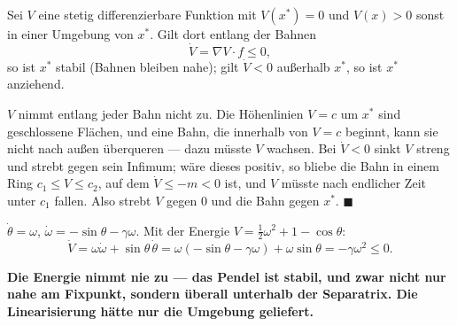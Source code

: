\begin{merksatz}
Sei $V$ eine stetig differenzierbare Funktion mit $V(x^{*}) = 0$ und $V(x) > 0$ sonst in einer Umgebung von $x^{*}$. Gilt dort entlang der Bahnen
\[ \dot V = \nabla V\cdot f \le 0 , \]
so ist $x^{*}$ stabil (Bahnen bleiben nahe); gilt $\dot V < 0$ außerhalb $x^{*}$, so ist $x^{*}$ anziehend.

$V$ nimmt entlang jeder Bahn nicht zu. Die Höhenlinien $V = c$ um $x^{*}$ sind geschlossene Flächen, und eine Bahn, die innerhalb von $V = c$ beginnt, kann sie nicht nach außen überqueren --- dazu müsste $V$ wachsen. Bei $\dot V < 0$ sinkt $V$ streng und strebt gegen sein Infimum; wäre dieses positiv, so bliebe die Bahn in einem Ring $c_1 \le V \le c_2$, auf dem $\dot V \le -m < 0$ ist, und $V$ müsste nach endlicher Zeit unter $c_1$ fallen. Also strebt $V$ gegen $0$ und die Bahn gegen $x^{*}$. $\blacksquare$

$\dot\theta = \omega$, $\dot\omega = -\sin\theta - \gamma\omega$. Mit der Energie $V = \tfrac12\omega^{2} + 1 - \cos\theta$:
\[ \dot V = \omega\dot\omega + \sin\theta\,\dot\theta = \omega(-\sin\theta - \gamma\omega) + \omega\sin\theta = -\gamma\omega^{2} \le 0 . \]

\begin{center}
\begin{minipage}{0.9\textwidth}
\textbf{Die Energie nimmt nie zu --- das Pendel ist stabil, und zwar nicht nur nahe am Fixpunkt, sondern überall unterhalb der Separatrix. Die Linearisierung hätte nur die Umgebung geliefert.}
\end{minipage}
\end{center}

\begin{center}
\begin{minipage}{0.88\textwidth}
\end{minipage}
\end{center}
\end{merksatz}

